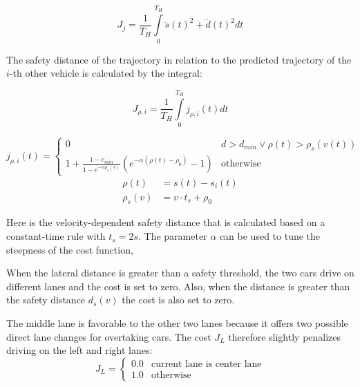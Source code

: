 \documentclass[twoside]{article}
\begin{document}
\begin{equation}
J_{j} = \frac{1}{T_H}\int\limits_0^{T_{H}}\dddot s(t)^2 + \dddot d(t)^2 dt
\end{equation}


The safety distance of the trajectory in relation to the predicted trajectory of the $i$-th
other vehicle is calculated by the integral:

\begin{equation}
J_{\rho,i} = \frac{1}{T_H} \int\limits_0^{T_H} j_{\rho,i}(t) dt
\end{equation}

\begin{equation}
j_{\rho,i}(t) =
\begin{cases}
  0 & d > d_{min} \vee \rho(t) > \rho_s(v(t)) \\
  1 + \frac{1 - c_{min}}{1-e^{-\alpha \rho_s(v)}} \left(e^{-\alpha(\rho(t) - \rho_{0})} - 1 \right) & \text{otherwise}
  \end{cases}
\end{equation}
\begin{align}
\rho(t) &= s(t) - s_i(t) \\
\rho_s(v) &= v \cdot t_s + \rho_0
\end{align}



Here  is the velocity-dependent safety distance that is calculated based on
a constant-time rule with $t_s = 2s$. The parameter $\alpha$ can be used to tune the steepness
of the cost function,

When the lateral distance is greater than a safety threshold, the two cars drive on
different lanes and the cost is set to zero. Also, when the distance is greater than
the safety distance $d_s(v)$ the cost is also set to zero.

The middle lane is favorable to the other two lanes because it offers two possible direct
lane changes for overtaking cars. The cost $J_L$ therefore slightly penalizes driving
on the left and right lanes:
\begin{equation}
J_L =
\begin{cases}
0.0 & \text{current lane is center lane} \\
1.0 & \text{otherwise}
\end{cases}
\end{equation}

\end{document}
